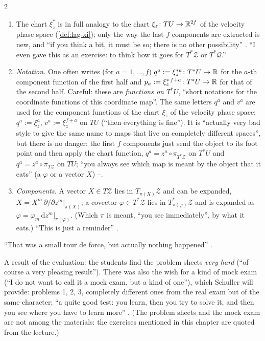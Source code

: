 \begin{paracol}{2}
\begin{remark}\label{rem:hq-three}
\begin{enumerate}
  \item The chart $\xi^*_z$ is in full analogy to the chart $\xi_z\colon T U\to\mathbb{R}^{2f}$ of the velocity phase space (\cref{def:lag-xi}); only the way the last $f$ components are extracted is new, and ``if you think a bit, it must be so; there is no other possibility'' . ``I even gave this as an exercise: to think how it goes for $T^*\mathcal Z$ or $T^*\mathcal Q$.'' 
  \item \emph{Notation.} One often writes (for $a=1,\dots,f$) $q^a:=\xi^{*a}_z\colon T^*U\to\mathbb{R}$ for the $a$-th component function of the first half and $p_a:=\xi^{*\,f+a}_z\colon T^*U\to\mathbb{R}$ for that of the second half. Careful: these are \emph{functions on $T^*U$}, ``short notations for the coordinate functions of this coordinate map''. The same letters $q^a$ and $v^a$ are used for the component functions of the chart $\xi_z$ of the velocity phase space: $q^a:=\xi_z^a$, $v^a:=\xi_z^{f+a}$ on $TU$ (``then everything is fine''). It is ``actually very bad style to give the same name to maps that live on completely different spaces'', but there is no danger: the first $f$ components just send the object to its foot point and then apply the chart function, $q^a=z^a\circ\pi_{T^*\mathcal Z}$ on $T^*U$ and $q^a=z^a\circ\pi_{T\mathcal Z}$ on $TU$; ``you always see which map is meant by the object that it eats'' (a $\varphi$ or a vector $X$) --.
  \item \emph{Components.} A vector $X\in T\mathcal Z$ lies in $T_{\pi(X)}\mathcal Z$ and can be expanded, $X=X^m\,\partial/\partial z^m|_{\pi(X)}$; a covector $\varphi\in T^*\mathcal Z$ lies in $T^*_{\pi(\varphi)}\mathcal Z$ and is expanded as $\varphi=\varphi_m\,\mathrm dz^m|_{\pi(\varphi)}$. (Which $\pi$ is meant, ``you see immediately'', by what it eats.) ``This is just a reminder'' .
\end{enumerate}
\end{remark}
``That was a small tour de force, but actually nothing happened'' .

\begin{coursenote}\label{cn:hq-mock}
A result of the evaluation: the students find the problem sheets \emph{very hard} (``of course a very pleasing result''). There was also the wish for a kind of mock exam (``I do not want to call it a mock exam, but a kind of one''), which Schuller will provide: problems 1, 2, 3, completely different ones from the real exam but of the same character; ``a quite good test: you learn, then you try to solve it, and then you see where you have to learn more'' . (The problem sheets and the mock exam are not among the materials: the exercises mentioned in this chapter are quoted from the lecture.)
\end{coursenote}


\end{paracol}
